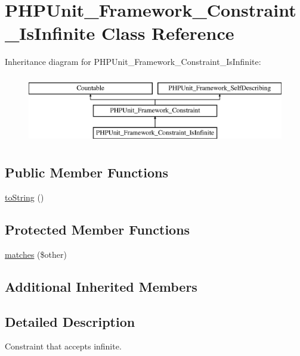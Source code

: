 \hypertarget{class_p_h_p_unit___framework___constraint___is_infinite}{}\section{P\+H\+P\+Unit\+\_\+\+Framework\+\_\+\+Constraint\+\_\+\+Is\+Infinite Class Reference}
\label{class_p_h_p_unit___framework___constraint___is_infinite}
Inheritance diagram for P\+H\+P\+Unit\+\_\+\+Framework\+\_\+\+Constraint\+\_\+\+Is\+Infinite\+:\begin{figure}[H]
\begin{center}
\leavevmode
\includegraphics[height=3.000000cm]{class_p_h_p_unit___framework___constraint___is_infinite}
\end{center}
\end{figure}
\subsection*{Public Member Functions}
\begin{DoxyCompactItemize}
\item 
\mbox{\hyperlink{class_p_h_p_unit___framework___constraint___is_infinite_a5558c5d549f41597377fa1ea8a1cefa3}{to\+String}} ()
\end{DoxyCompactItemize}
\subsection*{Protected Member Functions}
\begin{DoxyCompactItemize}
\item 
\mbox{\hyperlink{class_p_h_p_unit___framework___constraint___is_infinite_a9c9c337de483bbdbb9fa249a6c7c9cc5}{matches}} (\$other)
\end{DoxyCompactItemize}
\subsection*{Additional Inherited Members}


\subsection{Detailed Description}
Constraint that accepts infinite. 

